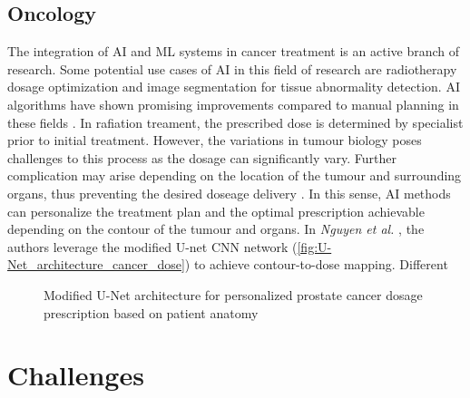 \documentclass[a4paper]{article}
\begin{document}
\subsection{Oncology}
The integration of AI and ML systems in cancer treatment is an active branch of research.
Some potential use cases of AI in this field of research are radiotherapy dosage optimization and image segmentation for tissue abnormality detection. AI algorithms have shown promising improvements compared to manual planning in these fields \cite{thompson_artificial_2018}.
In rafiation treament, the prescribed dose is determined by specialist prior to initial treatment. However, the variations in tumour biology poses challenges to this process as the dosage can significantly vary. Further complication may arise depending on the location of the tumour and surrounding organs, thus preventing the desired doseage delivery \cite{huynh_artificial_2020}. In this sense, AI methods can personalize the treatment plan and the optimal prescription achievable depending on the contour of the tumour and organs.
In \textit{Nguyen et al.} \cite{nguyen_feasibility_2019}, the authors leverage the modified U-net CNN network (\autoref{fig:U-Net_architecture_cancer_dose}) to achieve contour-to-dose mapping. Different 

\begin{figure}[htbp]
    \caption{Modified U-Net architecture for personalized prostate cancer dosage prescription based on patient anatomy}
    \label{fig:U-Net_architecture_cancer_dose}
\end{figure}

\section{Challenges}
\end{document}
